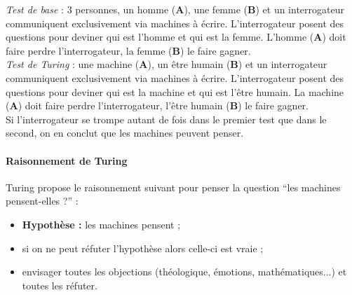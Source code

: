 \emph{Test de base} : 3 personnes, un homme (\textbf{A}), une femme (\textbf{B}) et un interrogateur communiquent exclusivement via machines à écrire. L'interrogateur posent des questions pour deviner qui est l'homme et qui est la femme. L'homme (\textbf{A}) doit faire perdre l'interrogateur, la femme (\textbf{B}) le faire gagner.\\

\emph{Test de Turing} : une machine (\textbf{A}), un être humain (\textbf{B}) et un interrogateur communiquent exclusivement via machines à écrire. L'interrogateur posent des questions pour deviner qui est la machine et qui est l'être humain. La machine (\textbf{A}) doit faire perdre l'interrogateur, l'être humain (\textbf{B}) le faire gagner.\\

Si l'interrogateur se trompe autant de fois dans le premier test que dans le second, on en conclut que les machines peuvent penser.

\paragraph{Raisonnement de Turing}
Turing propose le raisonnement suivant pour penser la question ``les machines pensent-elles ?'' :
\begin{itemize}
	\item \textbf{Hypothèse :} les machines pensent ;
	\item si on ne peut réfuter l'hypothèse alors celle-ci est vraie ;
	\item envisager toutes les objections (théologique, émotions, mathématiques...) et toutes les réfuter.
\end{itemize}
